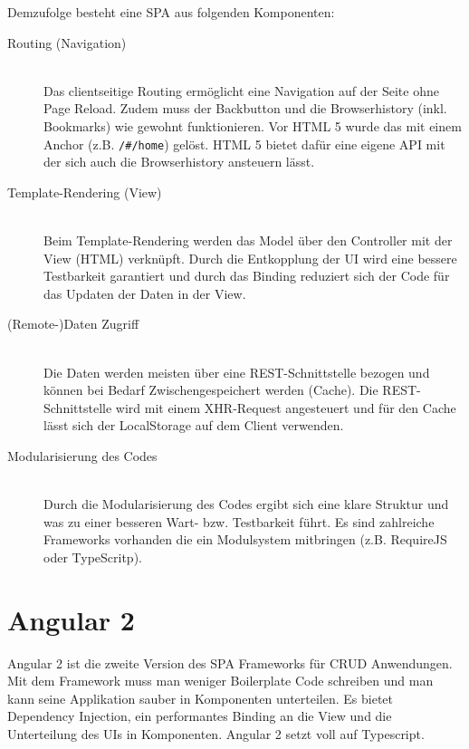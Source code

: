 Demzufolge besteht eine SPA aus folgenden Komponenten:
\begin{description}
	\item[Routing (Navigation)] \hfil \\
	Das clientseitige Routing ermöglicht eine Navigation auf der Seite ohne Page Reload. Zudem muss der Backbutton und die Browserhistory (inkl. Bookmarks) wie gewohnt funktionieren. Vor HTML 5 wurde das mit einem Anchor (z.B. \lstinline|/#/home|) gelöst. HTML 5 bietet dafür eine eigene API mit der sich auch die Browserhistory ansteuern lässt.
	\item[Template-Rendering (View)] \hfil \\
	Beim Template-Rendering werden das Model über den Controller mit der View (HTML) verknüpft. Durch die Entkopplung der UI wird eine bessere Testbarkeit garantiert und durch das Binding reduziert sich der Code für das Updaten der Daten in der View.
	\item[(Remote-)Daten Zugriff] \hfil \\
	Die Daten werden meisten über eine REST-Schnittstelle bezogen und können bei Bedarf Zwischengespeichert werden (Cache). Die REST-Schnittstelle wird mit einem XHR-Request angesteuert und für den Cache lässt sich der LocalStorage auf dem Client verwenden.
	\item[Modularisierung des Codes] \hfil \\
	Durch die Modularisierung des Codes ergibt sich eine klare Struktur und was zu einer besseren Wart- bzw. Testbarkeit führt. Es sind zahlreiche Frameworks vorhanden die ein Modulsystem mitbringen (z.B. RequireJS oder TypeScritp).
\end{description}

\section{Angular 2}

Angular 2 ist die zweite Version des SPA Frameworks für CRUD Anwendungen. Mit dem Framework muss man weniger Boilerplate Code schreiben und man kann seine Applikation sauber in Komponenten unterteilen. Es bietet Dependency Injection, ein performantes Binding an die View und die Unterteilung des UIs in Komponenten. Angular 2 setzt voll auf Typescript.

